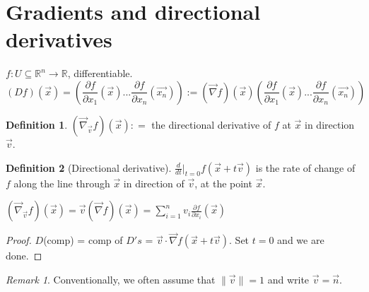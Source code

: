 \documentclass[12pt]{book}
\theoremstyle{definition}
\newtheorem{definition}{Definition}[section]
\theoremstyle{remark}
\newtheorem*{remark}{Remark}
\begin{document}
      \section{Gradients and directional derivatives}%
        \label{sub:Gradients and directional derivatives}
        $f: U\subseteq \mathbb{R}^n \rightarrow \mathbb{R}$, differentiable. 
        $$(Df)(\vec{{x}} ) = \left(\frac{\partial {f}}{\partial {x_1}} (\vec{{x}} ) ... \frac{\partial {f}}{\partial {x_n}} (\vec{{x_n}} )  \right) := (\vec{{\nabla}}f) (\vec{{x}})\left(\frac{\partial {f}}{\partial {x_1}} (\vec{{x}} ) ... \frac{\partial {f}}{\partial {x_n}} (\vec{{x_n}} )  \right)$$
        \begin{definition}
          $(\vec{{\nabla}}_{\vec{{v}}}f) (\vec{{x}}) : = $
           the directional derivative of $f$ at $\vec{{x}}$ in direction $\vec{{v}}$. 
        \end{definition}
        \begin{definition}[Directional derivative]
          $\frac{d}{dt}|_{t=0} f( \vec{{x}} + t \vec{{v}} )$ is the rate of change of $f$ along the line through $\vec{{x}} $ in direction of $\vec{{v}} $, at the point $\vec{{x}}$.  
        \end{definition}
        \begin{proposition} \label{}
          $(\vec{{\nabla}}_{\vec{{v}}}f) (\vec{{x}}) =  \vec{{v}} (\vec{{\nabla}} f)(\vec{{x}} ) = \sum^{n}_{i=1} v_i \frac{\partial {f}}{\partial {x_i}} (\vec{{x}})$
          \begin{proof} 
            $D$(comp) = comp of $D's$ = $\vec{{v}}\cdot  \vec{{\nabla}}f(\vec{{x}} + t \vec{{v}})$. Set $t = 0$ and we are done.  
          \end{proof}
        \end{proposition}
        \begin{remark} 
            Conventionally, we often assume that $\|\vec{{v}}\| = 1$ and write $\vec{{v}} = \vec{{n}}$.
        \end{remark}
\end{document}

